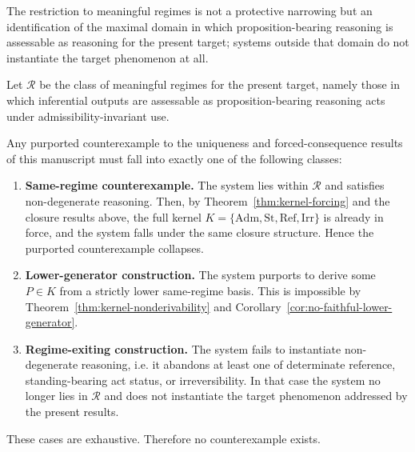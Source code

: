 The restriction to meaningful regimes is not a protective narrowing but an identification of the maximal domain in which proposition-bearing reasoning is assessable as reasoning for the present target; systems outside that domain do not instantiate the target phenomenon at all.

\begin{theorem}
\label{thm:scope-exhaustion}
Let $\mathcal{R}$ be the class of meaningful regimes for the present target, namely those in which inferential outputs are assessable as proposition-bearing reasoning acts under admissibility-invariant use.

Any purported counterexample to the uniqueness and forced-consequence results of this manuscript must fall into exactly one of the following classes:
\begin{enumerate}
  \item \textbf{Same-regime counterexample.} The system lies within $\mathcal{R}$ and satisfies non-degenerate reasoning. Then, by Theorem~\ref{thm:kernel-forcing} and the closure results above, the full kernel $K=\{\mathrm{Adm},\mathrm{St},\mathrm{Ref},\mathrm{Irr}\}$ is already in force, and the system falls under the same closure structure. Hence the purported counterexample collapses.
  \item \textbf{Lower-generator construction.} The system purports to derive some $P\in K$ from a strictly lower same-regime basis. This is impossible by Theorem~\ref{thm:kernel-nonderivability} and Corollary~\ref{cor:no-faithful-lower-generator}.
  \item \textbf{Regime-exiting construction.} The system fails to instantiate non-degenerate reasoning, i.e. it abandons at least one of determinate reference, standing-bearing act status, or irreversibility. In that case the system no longer lies in $\mathcal{R}$ and does not instantiate the target phenomenon addressed by the present results.
\end{enumerate}
These cases are exhaustive. Therefore no counterexample exists.
\end{theorem}

